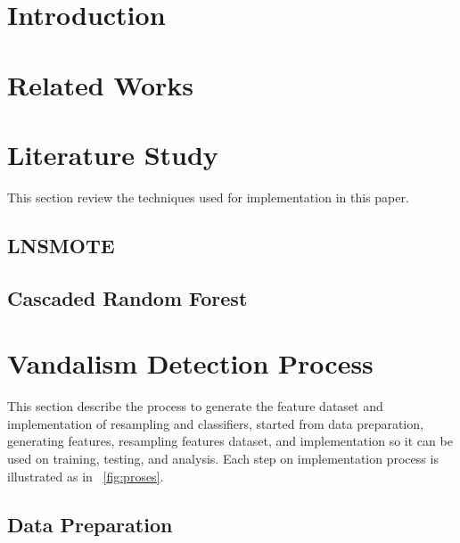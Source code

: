







\section{Introduction}
\label{section:introduction}
	

\section{Related Works}
	\label{section:related_works}
	

\section{Literature Study}
	\label{section:literature_study}

This section review the techniques used for implementation in this paper.

\subsection{LNSMOTE}
	\label{subsection:lnsmote}
	

\subsection{Cascaded Random Forest}
	\label{subsection:crf}
	

\section{Vandalism Detection Process}
	\label{section:research_methodology}

This section describe the process to generate the feature dataset and
implementation of resampling and classifiers, started from data preparation,
generating features, resampling features dataset, and implementation so it can
be used on training, testing, and analysis.
Each step on implementation process is illustrated as in \figurename\ \ref{fig:proses}.



\subsection{Data Preparation}
	\label{subsection:data_preparation}
	

